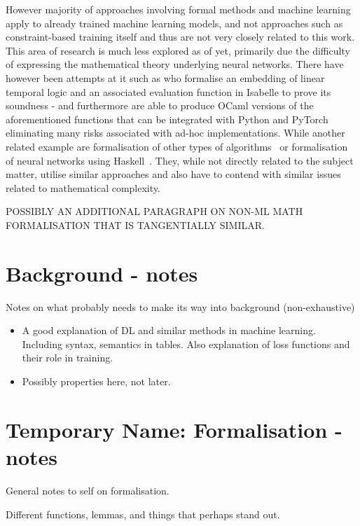\documentclass[a4paper,UKenglish,cleveref, autoref, thm-restate]{lipics-v2021}
\begin{document}
However majority of approaches involving formal methods and machine learning  apply to already trained machine learning models, and not approaches such as constraint-based training itself and thus are not very closely related to this work. This area of research is much less explored as of yet, primarily due the difficulty of expressing the mathematical theory underlying neural networks. There have however been attempts at it such as \cite{chevallier2022constrained} who formalise an embedding of linear temporal logic and an associated evaluation function in Isabelle to prove its soundness - and furthermore are able to produce OCaml versions of the aforementioned functions that can be integrated with Python and PyTorch eliminating many risks associated with ad-hoc implementations. 
While another related example are formalisation of other types of algorithms~\cite{daukantas2021trimming} or formalisation of neural networks using Haskell~\cite{xie2023haskell}. They, while not directly related to the subject matter, utilise similar approaches and also have to contend with similar issues related to mathematical complexity.

POSSIBLY AN ADDITIONAL PARAGRAPH ON NON-ML MATH FORMALISATION THAT IS TANGENTIALLY SIMILAR.



\section{Background - notes}


Notes on what probably needs to make its way into background (non-exhaustive)
\begin{itemize}
	\item A good explanation of DL and similar methods in machine learning. Including syntax, semantics in tables. Also explanation of loss functions and their role in training.
	\item Possibly properties here, not later.
\end{itemize}






\section{Temporary Name: Formalisation - notes}

General notes to self on formalisation.

Different functions, lemmas, and things that perhaps stand out.
\end{document}
